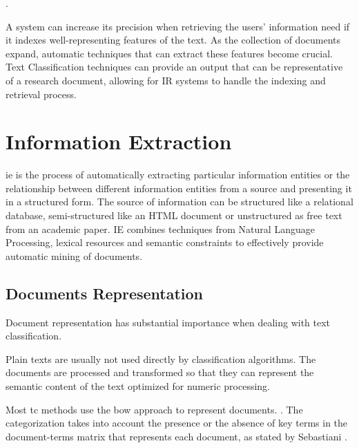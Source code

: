 \begin{displayquote}
\cite{Manning:2008}. 
\end{displayquote}

A system can increase its precision when retrieving the users' information need if it indexes well-representing features of the text. As the collection of documents expand, automatic techniques that can extract these features become crucial.  Text Classification techniques can provide an output that can be representative of a research document, allowing for IR systems to handle the indexing and retrieval process.

\section{\hspace*{3pt}Information Extraction}

\gls{ie} is the process of automatically extracting particular information entities or the relationship between different information entities from a source \cite{sarawagi2008information} and presenting it in a structured form. The source of information can be structured like a relational database, semi-structured like an HTML document or unstructured as free text from an academic paper. IE combines techniques from Natural Language Processing, lexical resources and semantic constraints to effectively provide automatic mining of documents.

\subsection{\hspace*{3pt}Documents Representation}

Document representation has substantial importance when dealing with text classification.

Plain texts are usually not used directly by classification algorithms.  The documents are processed and transformed so that they can represent the semantic content of the text optimized for numeric processing.   

Most \gls{tc} methods use the \gls{bow} approach to represent documents. \cite{Lan:2009} \cite{Manning:2008}. The categorization takes into account the presence or the absence of key terms in the document-terms matrix that represents each document, as stated by Sebastiani \cite{Sebastiani:2002}.

